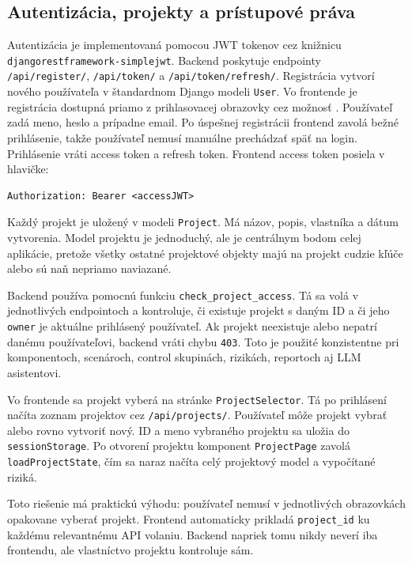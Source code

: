\documentclass[11pt]{article}
\begin{document}
\subsection{Autentizácia, projekty a prístupové práva}

Autentizácia je implementovaná pomocou JWT tokenov cez knižnicu \texttt{djangorestframework-simplejwt}. Backend poskytuje endpointy \texttt{/api/register/}, \texttt{/api/token/} a \texttt{/api/token/refresh/}. Registrácia vytvorí nového používateľa v štandardnom Django modeli \texttt{User}. Vo frontende je registrácia dostupná priamo z prihlasovacej obrazovky cez možnosť . Používateľ zadá meno, heslo a prípadne email. Po úspešnej registrácii frontend zavolá bežné prihlásenie, takže používateľ nemusí manuálne prechádzať späť na login. Prihlásenie vráti access token a refresh token. Frontend access token posiela v hlavičke:

\begin{verbatim}
Authorization: Bearer <accessJWT>
\end{verbatim}

Každý projekt je uložený v modeli \texttt{Project}. Má názov, popis, vlastníka a dátum vytvorenia. Model projektu je jednoduchý, ale je centrálnym bodom celej aplikácie, pretože všetky ostatné projektové objekty majú na projekt cudzie kľúče alebo sú naň nepriamo naviazané.

Backend používa pomocnú funkciu \texttt{check\_project\_access}. Tá sa volá v jednotlivých endpointoch a kontroluje, či existuje projekt s daným ID a či jeho \texttt{owner} je aktuálne prihlásený používateľ. Ak projekt neexistuje alebo nepatrí danému používateľovi, backend vráti chybu \texttt{403}. Toto je použité konzistentne pri komponentoch, scenároch, control skupinách, rizikách, reportoch aj LLM asistentovi.

Vo frontende sa projekt vyberá na stránke \texttt{ProjectSelector}. Tá po prihlásení načíta zoznam projektov cez \texttt{/api/projects/}. Používateľ môže projekt vybrať alebo rovno vytvoriť nový. ID a meno vybraného projektu sa uložia do \texttt{sessionStorage}. Po otvorení projektu komponent \texttt{ProjectPage} zavolá \texttt{loadProjectState}, čím sa naraz načíta celý projektový model a vypočítané riziká.

Toto riešenie má praktickú výhodu: používateľ nemusí v jednotlivých obrazovkách opakovane vyberať projekt. Frontend automaticky prikladá \texttt{project\_id} ku každému relevantnému API volaniu. Backend napriek tomu nikdy neverí iba frontendu, ale vlastníctvo projektu kontroluje sám.
\end{document}
